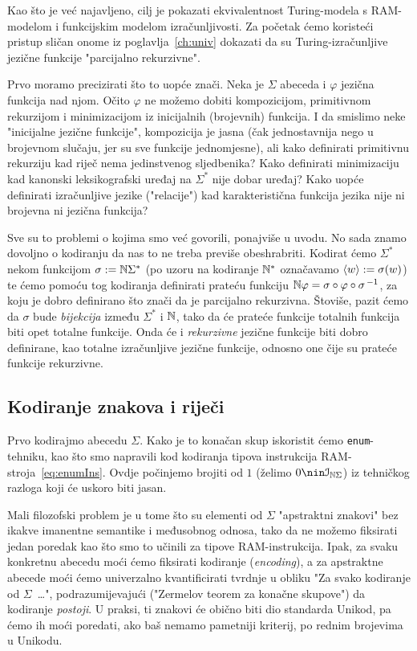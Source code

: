 Kao što je već najavljeno, cilj je pokazati ekvivalentnost Turing-modela s RAM-modelom i funkcijskim modelom izračunljivosti. Za početak ćemo koristeći pristup sličan onome iz poglavlja~\ref{ch:univ} dokazati da su Turing-izračunljive jezične funkcije "parcijalno rekurzivne".

Prvo moramo precizirati što to uopće znači. Neka je $\Sigma$ abeceda i $\varphi$ jezična funkcija nad njom. Očito $\varphi$ ne možemo dobiti kompozicijom, primitivnom rekurzijom i minimizacijom iz inicijalnih (brojevnih) funkcija. I da smislimo neke "inicijalne jezične funkcije", kompozicija je jasna (čak jednostavnija nego u brojevnom slučaju, jer su sve funkcije jednomjesne), ali kako definirati primitivnu rekurziju kad riječ nema jedinstvenog sljedbenika? Kako definirati minimizaciju kad kanonski leksikografski uređaj na $\Sigma^*$ nije dobar uređaj? Kako uopće definirati izračunljive jezike ("relacije") kad karakteristična funkcija jezika nije ni brojevna ni jezična funkcija?

Sve su to problemi o kojima smo već govorili, ponajviše u uvodu. No sada znamo dovoljno o kodiranju da nas to ne treba previše obeshrabriti. Kodirat ćemo $\Sigma^*$ nekom funkcijom $\sigma:={\mathbb N}\Sigma^*$ (po uzoru na kodiranje ${\mathbb N}^*$ označavamo $\langle w\rangle:=\sigma(w)$) te ćemo pomoću tog kodiranja definirati prateću funkciju ${\mathbb N}\varphi=\sigma\circ\varphi\circ\sigma^{\,-1}$, za koju je dobro definirano što znači da je parcijalno rekurzivna.
Štoviše, pazit ćemo da $\sigma$ bude \emph{bijekcija} između $\Sigma^*$ i ${\mathbb N}$, tako da će prateće funkcije totalnih funkcija biti opet totalne funkcije. Onda će i \emph{rekurzivne} jezične funkcije biti dobro definirane, kao totalne izračunljive jezične funkcije, odnosno one čije su prateće funkcije rekurzivne.

\subsection{Kodiranje znakova i riječi}\label{sec:kSigma}

Prvo kodirajmo abecedu $\Sigma$. Kako je to konačan skup iskoristit ćemo \texttt{enum}-tehniku, kao što smo napravili kod kodiranja tipova instrukcija RAM-stroja~\eqref{eq:enumIns}. Ovdje počinjemo brojiti od $1$ (želimo $0\nin\im{\N\Sigma}$) iz tehničkog razloga koji će uskoro biti jasan.

Mali filozofski problem je u tome što su elementi od $\Sigma$ "apstraktni znakovi" bez ikakve imanentne semantike i međusobnog odnosa, tako da ne možemo fiksirati jedan poredak kao što smo to učinili za tipove RAM-instrukcija. Ipak, za svaku konkretnu abecedu moći ćemo fiksirati kodiranje (\emph{encoding}), a za apstraktne abecede moći ćemo univerzalno kvantificirati tvrdnje u obliku "Za svako kodiranje od $\Sigma$~\ldots", podrazumijevajući ("Zermelov teorem za konačne skupove") da kodiranje \emph{postoji}. U praksi, ti znakovi će obično biti dio standarda Unikod, pa ćemo ih moći poredati, ako baš nemamo pametniji kriterij, po rednim brojevima u Unikodu.

